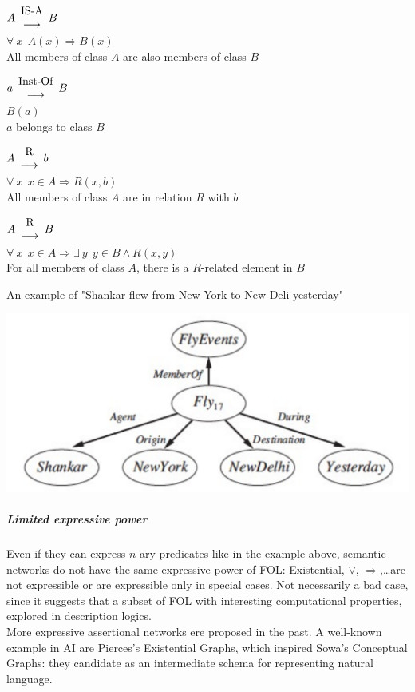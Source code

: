 \documentclass[10pt]{report}
\begin{document}
\begin{list}{}{}
	\item $A \begin{array}{c}
	\hbox{IS-A}\\\longrightarrow
	\end{array} B$\\
	$\forall\:x\:\:A(x)\Rightarrow B(x)$\\
	All members of class $A$ are also members of class $B$
	\item $a \begin{array}{c}
	\hbox{Inst-Of}\\\longrightarrow
	\end{array} B$\\
	$B(a)$\\
	$a$ belongs to class $B$
	\item $A \begin{array}{c}
	\hbox{R}\\\longrightarrow
	\end{array} b$\\
	$\forall\:x\:\:x\in A\Rightarrow R(x,b)$\\
	All members of class $A$ are in relation $R$ with $b$
	\item $A \begin{array}{c}
	\hbox{R}\\\longrightarrow
	\end{array} B$\\
	$\forall\:x\:\:x\in A\Rightarrow \exists\:y\:\:y\in B \wedge R(x,y)$\\
	For all members of class $A$, there is a $R$-related element in $B$
\end{list}
An example of "Shankar flew from New York to New Deli yesterday"
\begin{center}
	\includegraphics[scale=0.5]{18.png}
\end{center}
\subparagraph{Limited expressive power} Even if they can express $n$-ary predicates like in the example above, semantic networks do not have the same expressive power of FOL: Existential, $\vee$, $\Rightarrow$,\ldots are not expressible or are expressible only in special cases. Not necessarily a bad case, since it suggests that a subset of FOL with interesting computational properties, explored in description logics.\\
More expressive assertional networks ere proposed in the past. A well-known example in AI are Pierces's Existential Graphs, which inspired Sowa's Conceptual Graphs: they candidate as an intermediate schema for representing natural language.
\end{document}
